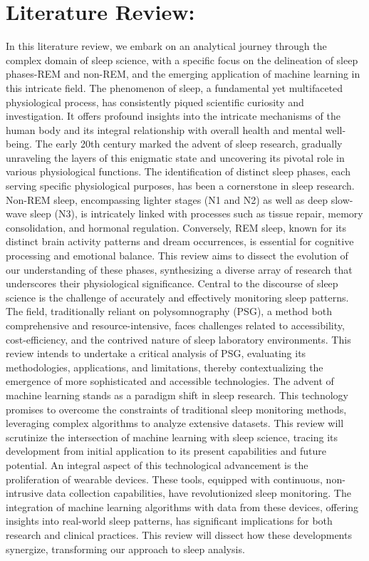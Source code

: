 \documentclass[12pt, a4paper,oneside]{book}
\numberwithin{equation}{section}
\begin{document}
\section{Literature Review:}\label{sec:2.4}
In this literature review, we embark on an analytical journey through the complex domain of sleep science, with a specific focus on the delineation of sleep phases-REM and non-REM, and the emerging application of machine learning in this intricate field. The phenomenon of sleep, a fundamental yet multifaceted physiological process, has consistently piqued scientific curiosity and investigation. It offers profound insights into the intricate mechanisms of the human body and its integral relationship with overall health and mental well-being.
The early 20th century marked the advent of sleep research, gradually unraveling the layers of this enigmatic state and uncovering its pivotal role in various physiological functions. The identification of distinct sleep phases, each serving specific physiological purposes, has been a cornerstone in sleep research. Non-REM sleep, encompassing lighter stages (N1 and N2) as well as deep slow-wave sleep (N3), is intricately linked with processes such as tissue repair, memory consolidation, and hormonal regulation. Conversely, REM sleep, known for its distinct brain activity patterns and dream occurrences, is essential for cognitive processing and emotional balance. This review aims to dissect the evolution of our understanding of these phases, synthesizing a diverse array of research that underscores their physiological significance.
Central to the discourse of sleep science is the challenge of accurately and effectively monitoring sleep patterns. The field, traditionally reliant on polysomnography (PSG), a method both comprehensive and resource-intensive, faces challenges related to accessibility, cost-efficiency, and the contrived nature of sleep laboratory environments. This review intends to undertake a critical analysis of PSG, evaluating its methodologies, applications, and limitations, thereby contextualizing the emergence of more sophisticated and accessible technologies.
The advent of machine learning stands as a paradigm shift in sleep research. This technology promises to overcome the constraints of traditional sleep monitoring methods, leveraging complex algorithms to analyze extensive datasets. This review will scrutinize the intersection of machine learning with sleep science, tracing its development from initial application to its present capabilities and future potential.
An integral aspect of this technological advancement is the proliferation of wearable devices. These tools, equipped with continuous, non-intrusive data collection capabilities, have revolutionized sleep monitoring. The integration of machine learning algorithms with data from these devices, offering insights into real-world sleep patterns, has significant implications for both research and clinical practices. This review will dissect how these developments synergize, transforming our approach to sleep analysis.
\end{document}
